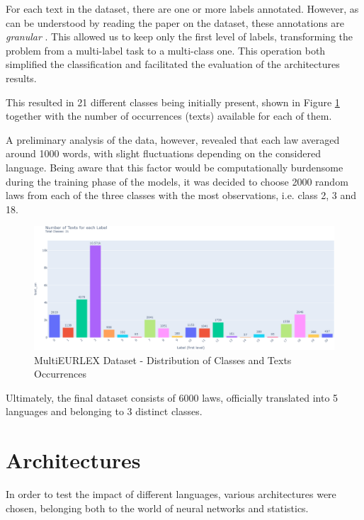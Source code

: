 \documentclass[letterpaper,11pt]{article}
\begin{document}
For each text in the dataset, there are one or more labels annotated. However, as can be understood by reading the paper on the dataset, these annotations are \textit{granular} \cite{Chalkidis2021MultiEURLEXA}. This allowed us to keep only the first level of labels, transforming the problem from a multi-label task to a multi-class one. This operation both simplified the classification and facilitated the evaluation of the architectures results.

This resulted in 21 different classes being initially present, shown in Figure \ref{fig:original_classes} together with the number of occurrences (texts) available for each of them.

A preliminary analysis of the data, however, revealed that each law averaged around 1000 words, with slight fluctuations depending on the considered language. Being aware that this factor would be computationally burdensome during the training phase of the models, it was decided to choose 2000 random laws from each of the three classes with the most observations, i.e. class 2, 3 and 18.

\begin{figure}[H]
  \centering
  \includegraphics[width=\textwidth]{data_original_classes.png}
  \caption{MultiEURLEX Dataset - Distribution of Classes and Texts Occurrences}
  \label{fig:original_classes}
\end{figure}



Ultimately, the final dataset consists of 6000 laws, officially translated into 5 languages and belonging to 3 distinct classes.

\section{Architectures}
\label{sec:architectures}

In order to test the impact of different languages, various architectures were chosen, belonging both to the world of neural networks and statistics.
\end{document}
